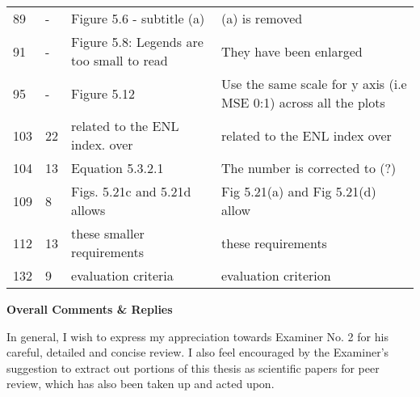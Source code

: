 \begin{longtable}[c]{p{}|p{}|p{}|p{}}
89 & - & Figure 5.6 - subtitle (a) & (a) is removed \\
91 & - & Figure 5.8: Legends are too small to read & They have been enlarged \\
95 & - & Figure 5.12 & Use the same scale for  y axis (i.e MSE 0:1) across all the plots \\
103 & 22 & related to the ENL index. over & related to the ENL index over \\
104 & 13 & Equation 5.3.2.1 & The number is corrected to (?) \\  %
109 & 8 & Figs. 5.21c and 5.21d allows & Fig 5.21(a) and Fig 5.21(d) allow \\
112 & 13 & these smaller requirements & these requirements \\
132 & 9 & evaluation criteria & evaluation criterion
\end{longtable}    

\textbf{Overall Comments \& Replies}

In general, I wish to express my appreciation towards Examiner No. 2 for his careful, detailed and concise review.
I also feel encouraged by the Examiner's suggestion to extract out portions of this thesis as scientific papers for peer review, which has also been taken up and acted upon.

%



